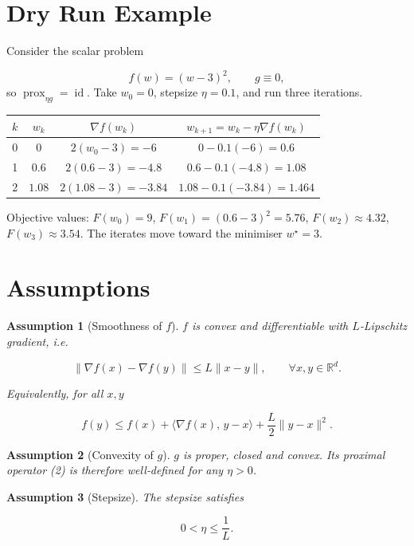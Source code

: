 \documentclass{article}
\newtheorem{assumption}{Assumption}
\newcommand{\prox}{\operatorname{prox}}
\newcommand{\grad}{\nabla}
\newcommand{\R}{\mathbb{R}}
\begin{document}
\section*{Dry Run Example}
Consider the scalar problem  

\[
f(w)=(w-3)^{2},\qquad g\equiv0,
\]
so $\prox_{\eta g}= \operatorname{id}$.
Take $w_{0}=0$, stepsize $\eta=0.1$, and run three iterations.

\begin{center}
\begin{tabular}{c|c|c|c}
$k$ & $w_{k}$ & $\grad f(w_{k})$ & $w_{k+1}=w_{k}-\eta\grad f(w_{k})$ \\ \hline
0 & $0$ & $2(w_{0}-3)=-6$ & $0-0.1(-6)=0.6$ \\
1 & $0.6$ & $2(0.6-3)=-4.8$ & $0.6-0.1(-4.8)=1.08$ \\
2 & $1.08$ & $2(1.08-3)=-3.84$ & $1.08-0.1(-3.84)=1.464$ \\
\end{tabular}
\end{center}

Objective values: $F(w_{0})=9$, $F(w_{1})=(0.6-3)^{2}=5.76$, $F(w_{2})\approx4.32$, $F(w_{3})\approx3.54$.
The iterates move toward the minimiser $w^{\star}=3$.

\newpage
\section*{Assumptions}
\begin{assumption}[Smoothness of $f$]\label{A:smooth}
$f$ is convex and differentiable with $L$‑Lipschitz gradient, i.e.  

\[
\|\grad f(x)-\grad f(y)\|\le L\|x-y\|,\qquad\forall x,y\in\R^{d}.
\tag{A1}
\]

Equivalently, for all $x,y$  

\[
f(y)\le f(x)+\langle\grad f(x),\,y-x\rangle+\frac{L}{2}\|y-x\|^{2}.
\tag{A2}
\]
\end{assumption}

\begin{assumption}[Convexity of $g$]\label{A:convex}
$g$ is proper, closed and convex. Its proximal operator (2) is therefore
well‑defined for any $\eta>0$.
\end{assumption}

\begin{assumption}[Stepsize]\label{A:stepsize}
The stepsize satisfies  

\[
0<\eta\le\frac{1}{L}.
\tag{A4}
\]
\end{assumption}
\end{document}
